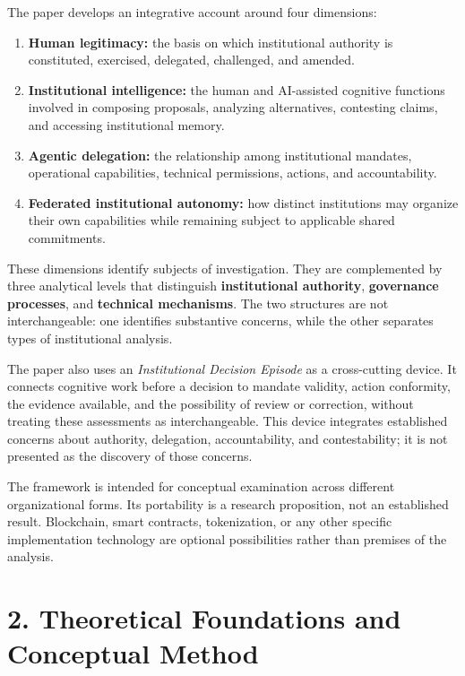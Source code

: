 \documentclass[
  10pt,
]{article}
\providecommand{\tightlist}{%
  \setlength{\itemsep}{0pt}\setlength{\parskip}{0pt}}
\begin{document}
The paper develops an integrative account around four dimensions:

\begin{enumerate}
\def\labelenumi{\arabic{enumi}.}
\tightlist
\item
  \textbf{Human legitimacy:} the basis on which institutional authority
  is constituted, exercised, delegated, challenged, and amended.
\item
  \textbf{Institutional intelligence:} the human and AI-assisted
  cognitive functions involved in composing proposals, analyzing
  alternatives, contesting claims, and accessing institutional memory.
\item
  \textbf{Agentic delegation:} the relationship among institutional
  mandates, operational capabilities, technical permissions, actions,
  and accountability.
\item
  \textbf{Federated institutional autonomy:} how distinct institutions
  may organize their own capabilities while remaining subject to
  applicable shared commitments.
\end{enumerate}

These dimensions identify subjects of investigation. They are
complemented by three analytical levels that distinguish
\textbf{institutional authority}, \textbf{governance processes}, and
\textbf{technical mechanisms}. The two structures are not
interchangeable: one identifies substantive concerns, while the other
separates types of institutional analysis.

The paper also uses an \emph{Institutional Decision Episode} as a
cross-cutting device. It connects cognitive work before a decision to
mandate validity, action conformity, the evidence available, and the
possibility of review or correction, without treating these assessments
as interchangeable. This device integrates established concerns about
authority, delegation, accountability, and contestability; it is not
presented as the discovery of those concerns.

The framework is intended for conceptual examination across different
organizational forms. Its portability is a research proposition, not an
established result. Blockchain, smart contracts, tokenization, or any
other specific implementation technology are optional possibilities
rather than premises of the analysis.

\section{2. Theoretical Foundations and Conceptual
Method}\label{theoretical-foundations-and-conceptual-method}
\end{document}
